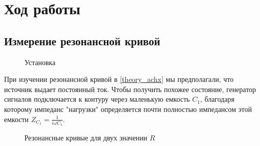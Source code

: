 \documentclass{article}
\begin{document}
\section{Ход работы}
\subsection{Измерение резонансной кривой}\label{mes_achx}
\begin{figure}[h]
    \caption{Установка}\label{fig:ustanovka}
    \newpage
\end{figure}

При изучении резонансной кривой в \ref{theory_achx} мы предполагали, что источник выдает
постоянный ток. Чтобы получить похожее состояние, генератор сигналов подключается к
контуру через маленькую емкость $C_1$, благодаря которому импеданс "нагрузки"
определяется почти полностью импедансом этой емкости $Z_{C_1} = \frac{1}{i\omega C_1}$.

\begin{figure}[h]
    \caption{Резонансные кривые для двух значении $R$}\label{fig:achx}
    \newpage
\end{figure}
\end{document}

